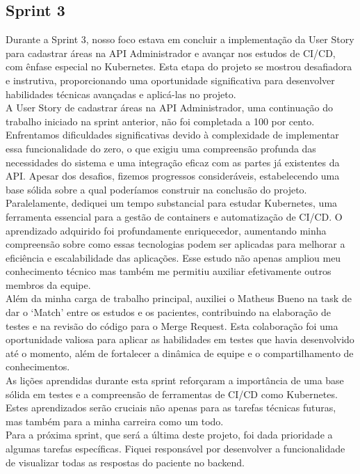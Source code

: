 \subsection{Sprint 3}
Durante a Sprint 3, nosso foco estava em concluir a implementação da User Story para cadastrar áreas na API Administrador e avançar nos estudos de CI/CD, com ênfase especial no Kubernetes. Esta etapa do projeto se mostrou desafiadora e instrutiva, proporcionando uma oportunidade significativa para desenvolver habilidades técnicas avançadas e aplicá-las no projeto.\\

A User Story de cadastrar áreas na API Administrador, uma continuação do trabalho iniciado na sprint anterior, não foi completada a 100 por cento. Enfrentamos dificuldades significativas devido à complexidade de implementar essa funcionalidade do zero, o que exigiu uma compreensão profunda das necessidades do sistema e uma integração eficaz com as partes já existentes da API. Apesar dos desafios, fizemos progressos consideráveis, estabelecendo uma base sólida sobre a qual poderíamos construir na conclusão do projeto.\\

Paralelamente, dediquei um tempo substancial para estudar Kubernetes, uma ferramenta essencial para a gestão de containers e automatização de CI/CD. O aprendizado adquirido foi profundamente enriquecedor, aumentando minha compreensão sobre como essas tecnologias podem ser aplicadas para melhorar a eficiência e escalabilidade das aplicações. Esse estudo não apenas ampliou meu conhecimento técnico mas também me permitiu auxiliar efetivamente outros membros da equipe.\\

Além da minha carga de trabalho principal, auxiliei o Matheus Bueno na task de dar o ‘Match’ entre os estudos e os pacientes, contribuindo na elaboração de testes e na revisão do código para o Merge Request. Esta colaboração foi uma oportunidade valiosa para aplicar as habilidades em testes que havia desenvolvido até o momento, além de fortalecer a dinâmica de equipe e o compartilhamento de conhecimentos.\\
As lições aprendidas durante esta sprint reforçaram a importância de uma base sólida em testes e a compreensão de ferramentas de CI/CD como Kubernetes. Estes
aprendizados serão cruciais não apenas para as tarefas técnicas futuras, mas também para a minha carreira como um todo.\\
Para a próxima sprint, que será a última deste projeto, foi dada prioridade a algumas tarefas específicas. Fiquei responsável por desenvolver a funcionalidade de visualizar todas as respostas do paciente no backend.
